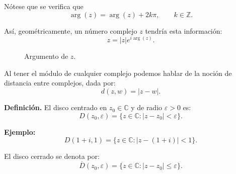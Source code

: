 \documentclass[a4paper,12pt]{article}
\begin{document}
\medskip
\noindent Nótese que se verifica que
\[
\arg(z) = \arg(z) + 2k\pi, \qquad k \in \mathbb{Z}.
\]

Así, geométricamente, un número complejo $z$ tendría esta información:
\[
z = |z| e^{i\arg(z)}.
\]

\begin{figure}[h]
\centering
{}

\medskip
{\small Argumento de \(z\).}
\end{figure}

Al tener el módulo de cualquier complejo podemos hablar de la noción de distancia entre complejos,
dada por:
\[
d(z,w) = |z-w|.
\]

\noindent\textbf{Definición.} El disco centrado en $z_0 \in \mathbb{C}$ y de radio $\varepsilon > 0$ es:
\[
D(z_0,\varepsilon) = \{ z \in \mathbb{C} : |z - z_0| < \varepsilon \}.
\]

\noindent\textbf{Ejemplo:} 
\[
D(1+i,1) = \{ z \in \mathbb{C} : |z-(1+i)| < 1 \}.
\]

El disco cerrado se denota por:
\[
\overline{D}(z_0,\varepsilon) = \{ z \in \mathbb{C} : |z - z_0| \leq \varepsilon \}.
\]
\end{document}
